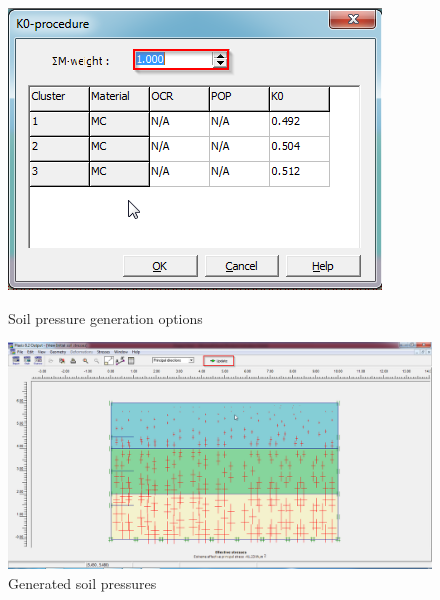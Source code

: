 \begin{landscape}
\begin{figure}[hbtp]
  \centering
  \includegraphics[height=0.25\textheight]{images/plx/a (11).png}
  \caption{Soil pressure generation options}
  \vfill
  \includegraphics[height=0.65\textheight]{images/plx/a (12).png}
  \caption{Generated soil pressures}
\end{figure}
\end{landscape}
\break
